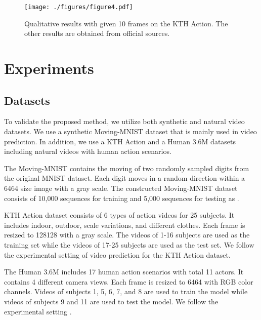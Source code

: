 \documentclass[final]{cvpr}
\begin{document}
\begin{figure*}[t]
	\begin{minipage}[b]{1.0\linewidth}
		\centering
		\centerline{\texttt{[image: ./figures/figure4.pdf]}}
	\end{minipage}
		\vspace{-0.6cm}
	\caption{Qualitative results with given 10 frames on the KTH Action. The other results are obtained from official sources.}
	\label{figure4}
\vspace{-0.1cm}
\end{figure*}


\section{Experiments}
\subsection{Datasets}
To validate the proposed method, we utilize both synthetic and natural video datasets. We use a synthetic Moving-MNIST dataset \cite{srivastava2015unsupervised} that is mainly used in video prediction. In addition, we use a KTH Action \cite{schuldt2004recognizing} and a Human 3.6M \cite{ionescu2013human3} datasets including natural videos with human action scenarios.

The Moving-MNIST \cite{srivastava2015unsupervised} contains the moving of two randomly sampled digits from the original MNIST dataset. Each digit moves in a random direction within a 6464 size image with a gray scale. The constructed Moving-MNIST dataset consists of 10,000 sequences for training and 5,000 sequences for testing as \cite{wang2018predrnn++}.

KTH Action dataset \cite{schuldt2004recognizing} consists of 6 types of action videos for 25 subjects. It includes indoor, outdoor, scale variations, and different clothes. Each frame is resized to 128128 with a gray scale. The videos of 1-16 subjects are used as the training set while the videos of 17-25 subjects are used as the test set.  We follow the experimental setting \cite{villegas2017decomposing} of video prediction for the KTH Action dataset.

The Human 3.6M \cite{ionescu2013human3} includes 17 human action scenarios with total 11 actors. It contains 4 different camera views. Each frame is resized to 6464 with RGB color channels. Videos of subjects 1, 5, 6, 7, and 8 are used to train the model while videos of subjects 9 and 11 are used to test the model. We follow the experimental setting \cite{villegas2017learning}. 
\end{document}
